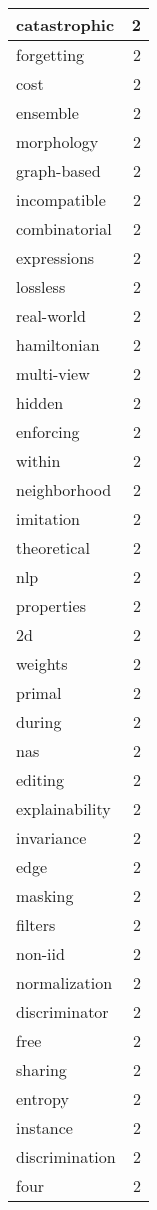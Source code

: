 \begin{table}[h]
\begin{tabular}{|l|r|}
\hline
catastrophic & 2 \\
\hline
forgetting & 2 \\
\hline
cost & 2 \\
\hline
ensemble & 2 \\
\hline
morphology & 2 \\
\hline
graph-based & 2 \\
\hline
incompatible & 2 \\
\hline
combinatorial & 2 \\
\hline
expressions & 2 \\
\hline
lossless & 2 \\
\hline
real-world & 2 \\
\hline
hamiltonian & 2 \\
\hline
multi-view & 2 \\
\hline
hidden & 2 \\
\hline
enforcing & 2 \\
\hline
within & 2 \\
\hline
neighborhood & 2 \\
\hline
imitation & 2 \\
\hline
theoretical & 2 \\
\hline
nlp & 2 \\
\hline
properties & 2 \\
\hline
2d & 2 \\
\hline
weights & 2 \\
\hline
primal & 2 \\
\hline
during & 2 \\
\hline
nas & 2 \\
\hline
editing & 2 \\
\hline
explainability & 2 \\
\hline
invariance & 2 \\
\hline
edge & 2 \\
\hline
masking & 2 \\
\hline
filters & 2 \\
\hline
non-iid & 2 \\
\hline
normalization & 2 \\
\hline
discriminator & 2 \\
\hline
free & 2 \\
\hline
sharing & 2 \\
\hline
entropy & 2 \\
\hline
instance & 2 \\
\hline
discrimination & 2 \\
\hline
four & 2 \\

\end{tabular}
\end{table}
